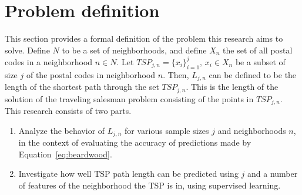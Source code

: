 \section{Problem definition}
This section provides a formal definition of the problem this research aims to solve.
Define $N$ to be a set of neighborhoods, and define $X_n$ the set of all postal codes in a neighborhood
$n\in N$. Let $TSP_{j,n}=\{x_i\}_{i=1}^j,\,x_i\in X_n$ be a subset of size $j$ of the postal codes in neighborhood $n$.
Then, $L_{j,n}$ can be defined to be the length of the shortest path through the set $TSP_{j,n}$. This is the length of
the solution of the traveling salesman problem consisting of the points in $TSP_{j,n}$.
This research consists of two parts.
\begin{enumerate}
	\item Analyze the behavior of \( L_{j,n} \) for various sample sizes \( j \) and neighborhoods \( n \),
	      in the context of evaluating the accuracy of predictions made by Equation~\ref{eq:beardwood}.
	\item Investigate how well TSP path length can be predicted using $j$ and a number of features of the neighborhood
	      the TSP is in, using supervised learning.
\end{enumerate}
